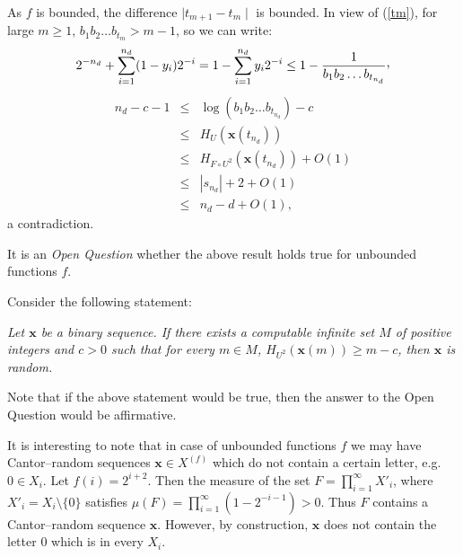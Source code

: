 \documentclass[12pt]{iopart}
\begin{document}
As $f$ is bounded, the difference  $\mid t_{m+1}-  t_{m}\mid$ is bounded.  In view of (\ref{tm}), for large $m\ge 1$,
$b_{1}b_{2}\ldots b_{t_{m}} > m-1$, so we can write:
\begin{equation}
\label{errorcb}
2^{-n_{d}} + \sum_{i=1}^{n_{d}} (1-y_{i})2^{-i} = 1 - \sum_{i=1}^{n_{d}}
y_{i}2^{-i} \le  1 - \frac{1}{b_{1}b_{2}\ldots b_{t_{n_{d}}}}{\raisebox{.5ex}{,}}
\end{equation}
\begin{eqnarray*}
n_{d} - c -1  & \le & \log (b_{1}b_{2}\ldots b_{t_{n_{d}}}) - c\\
 & \le &  H_{U}({\mathbf x} (t_{n_{d}}))\\
 & \le & H_{F \circ U^{2}} ({\mathbf x} (t_{n_{d}})) + O(1)\\
 & \le & |s_{n_{d}}| +  2 + O(1)\\
& \le & n_{d} -d +  O(1),
\end{eqnarray*}
a contradiction.


It is an {\it Open Question} whether the above result holds true for unbounded
functions $f$.


Consider the following statement:
 \begin{center}
 \it
 Let ${\mathbf x}$ be a binary sequence. If there exists a computable infinite set
 $M$ of positive integers and $c>0$ such that for every $m\in M$, $H_{U^{2}}({\mathbf x}(m))
 \ge m-c$, then ${\mathbf x}$ is random.
 \end{center}
 Note that if the above statement would be true,
then the answer to the Open Question would be affirmative.


It is interesting to note that in case of unbounded functions $f$ we
may have Cantor--random sequences ${\mathbf x}\in {X^{(f)}}$ which do not contain a
certain letter, e.g. $0\in X_i$.
Let $f(i)= 2^{i+2}$. Then the measure of the set $F=
\prod_{i=1}^\infty X'_i$, where $X'_i=X_i\setminus \{0\}$ satisfies
$\mu(F) = \prod_{i=1}^\infty (1- 2^{-i-1})>0$. Thus $F$ contains a
Cantor--random sequence ${\mathbf x}$.
However, by construction, ${\mathbf x}$ does not contain the letter $0$ which is in every $X_i$.
\end{document}
